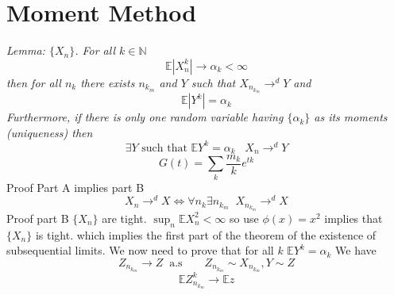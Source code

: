 \documentclass[11pt]{article}
\begin{document}
\section{Moment Method}
\emph{
    Lemma:  $\{X_n\}$. For all  $k \in \mathbb{N}$
    \[
    \mathbb{E}|X_n^{k}| \rightarrow \alpha_k < \infty
    \] 
    then for all $n_k$ there exists  $n_{k_m}$ and  $Y$ such that  $X_{n_{k_m}} \rightarrow^{d} Y$ and
    \[
    \mathbb{E}|Y^{k}| = \alpha_k
    \] 
    Furthermore, if there is only one random variable having $\{\alpha_k\}$ as its moments (uniqueness) then
    \[
        \exists Y \text{ such that } \mathbb{E}Y^{k} = \alpha_k \;\;\; X_n \rightarrow^{d} Y
    \] 
}
\[
G(t) = \sum_{k}^{}\frac{m_k}{k}e^{tk}
\] 
Proof Part A implies part B
 \[
     X_n \rightarrow^{d} X \iff \forall n_k \exists n_{k_m} \;\; X_{n_{k_m}} \rightarrow^{d} X
\] 
Proof part B $\{X_n\}$ are tight.  $ \sup_n \mathbb{E} X_n^2 <\infty$ so use $\phi(x) = x^2$ implies that $\{X_n\}$ is tight. which implies
the first part of the theorem of the existence of subsequential limits. We now need to prove that for all $k$  $  \mathbb{E}Y^{k} = \alpha_k$ 
We have 
\[
    Z_{n_{k_m}} \rightarrow Z \;\; \text{a.s} \qquad Z_{n_{k_m}} \sim X_{n_{k_m}}, Y \sim Z
\] 
\[
    \mathbb{E}Z_{n_{k_m}}^{k} \rightarrow \mathbb{E}z
\] 
\end{document}
